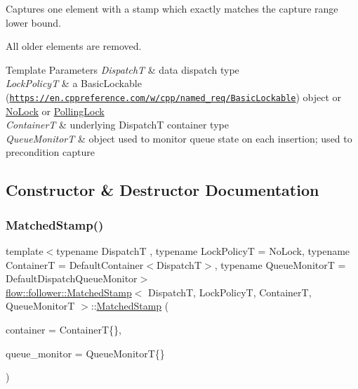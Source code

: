 Captures one element with a stamp which exactly matches the capture range lower bound. 

All older elements are removed.


\begin{DoxyTemplParams}{Template Parameters}
{\em DispatchT} & data dispatch type \\
\hline
{\em Lock\+PolicyT} & a Basic\+Lockable (\href{https://en.cppreference.com/w/cpp/named_req/BasicLockable}{\tt https\+://en.\+cppreference.\+com/w/cpp/named\+\_\+req/\+Basic\+Lockable}) object or \hyperlink{structflow_1_1_no_lock}{No\+Lock} or \hyperlink{structflow_1_1_polling_lock}{Polling\+Lock} \\
\hline
{\em ContainerT} & underlying {\ttfamily DispatchT} container type \\
\hline
{\em Queue\+MonitorT} & object used to monitor queue state on each insertion; used to precondition capture \\
\hline
\end{DoxyTemplParams}


\subsection{Constructor \& Destructor Documentation}
\mbox{\label{classflow_1_1follower_1_1_matched_stamp_a67f6b9b316170b553333d3c25dd47be0}} 
\subsubsection{\texorpdfstring{Matched\+Stamp()}{MatchedStamp()}}
{\footnotesize\ttfamily template$<$typename DispatchT , typename Lock\+PolicyT  = No\+Lock, typename ContainerT  = Default\+Container$<$\+Dispatch\+T$>$, typename Queue\+MonitorT  = Default\+Dispatch\+Queue\+Monitor$>$ \\
\hyperlink{classflow_1_1follower_1_1_matched_stamp}{flow\+::follower\+::\+Matched\+Stamp}$<$ DispatchT, Lock\+PolicyT, ContainerT, Queue\+MonitorT $>$\+::\hyperlink{classflow_1_1follower_1_1_matched_stamp}{Matched\+Stamp} (\begin{DoxyParamCaption}\item[{const ContainerT \&}]{container = {\ttfamily ContainerT\{\}},  }\item[{const Queue\+MonitorT \&}]{queue\+\_\+monitor = {\ttfamily QueueMonitorT\{\}} }\end{DoxyParamCaption})\hspace{0.3cm}{\ttfamily [explicit]}}



